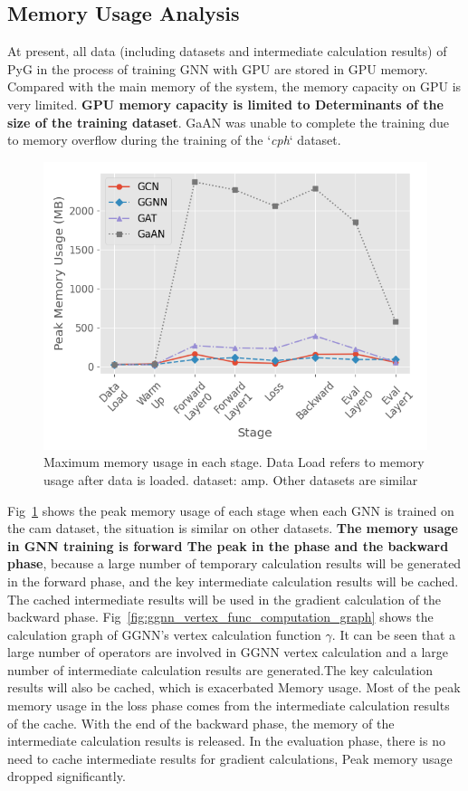 \subsection{Memory Usage Analysis}

At present, all data (including datasets and intermediate calculation results) of PyG in the process of training GNN with GPU
are stored in GPU memory. Compared with the main memory of the system, the memory capacity on GPU is very limited.
\textbf{GPU memory capacity is limited to Determinants of the size of the training dataset}. 
GaAN was unable to complete the training due to memory overflow during the training of the `\textit{cph}` dataset.

\begin{figure}
    \centering
    \includegraphics[width=0.7\columnwidth]{figs/experiments/exp_memory_usage_stage_amp.png}
    \caption{Maximum memory usage in each stage. Data Load refers to memory usage after data is loaded. dataset: amp. Other datasets are similar}
    \label{fig:exp_memory_usage_stage_amp}
\end{figure}

Fig~\ref{fig:exp_memory_usage_stage_amp} shows the peak memory usage of each stage when each GNN is trained on the cam dataset, the situation is similar on other datasets.
\textbf{The memory usage in GNN training is forward The peak in the phase and the backward phase}, 
because a large number of temporary calculation results will be generated in the forward phase,
and the key intermediate calculation results will be cached.
The cached intermediate results will be used in the gradient calculation of the backward phase.
Fig~\ref{fig:ggnn_vertex_func_computation_graph} shows the calculation graph of GGNN's vertex calculation function $\gamma$.
It can be seen that a large number of operators are involved in GGNN vertex calculation and a large number of intermediate calculation results are generated.The key calculation results will also be cached,
which is exacerbated Memory usage. Most of the peak memory usage in the loss phase comes from the intermediate calculation results of the cache.
With the end of the backward phase, the memory of the intermediate calculation results is released.
In the evaluation phase, there is no need to cache intermediate results for gradient calculations, Peak memory usage dropped significantly.


